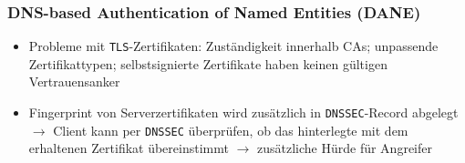 \subsubsection{DNS-based Authentication of Named Entities (DANE)}
\begin{itemize}
	\item Probleme mit \texttt{TLS}-Zertifikaten: Zuständigkeit innerhalb CAs; unpassende Zertifikattypen; selbstsignierte Zertifikate haben keinen gültigen Vertrauensanker
	\item Fingerprint von Serverzertifikaten wird zusätzlich in \texttt{DNSSEC}-Record abgelegt \(\rightarrow\) Client kann per \texttt{DNSSEC} überprüfen, ob das hinterlegte mit dem erhaltenen Zertifikat übereinstimmt \(\rightarrow\) zusätzliche Hürde für Angreifer
\end{itemize}



